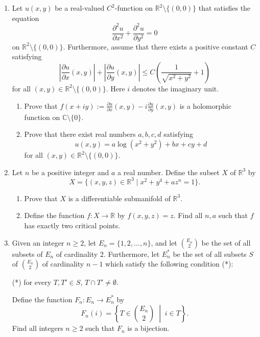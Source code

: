 \documentclass{article}
\begin{document}
\begin{enumerate}[label=\fbox{\arabic*}]
  \item Let $u(x, y)$ be a real-valued $C^2$-function on $\mathbb{R}^2 \setminus \{(0, 0)\}$ that satisfies the equation
        \[ \frac{\partial^2 u}{\partial x^2} + \frac{\partial^2 u}{\partial y^2} = 0 \]
        on $\mathbb{R}^2 \setminus \{(0, 0)\}$. Furthermore, assume that there exists a positive constant $C$ satisfying
        \[ \left| \frac{\partial u}{\partial x}(x, y) \right| + \left| \frac{\partial u}{\partial y}(x, y) \right| \le C \left( \frac{1}{\sqrt{x^2 + y^2}} + 1 \right) \]
        for all $(x, y) \in \mathbb{R}^2 \setminus \{(0, 0)\}$. Here $i$ denotes the imaginary unit.
        \begin{enumerate}[label=(\arabic*)]
          \item Prove that $f(x + iy) := \frac{\partial u}{\partial x}(x, y) - i \frac{\partial u}{\partial y}(x, y)$ is a holomorphic function on $\mathbb{C} \setminus \{0\}$.
          \item Prove that there exist real numbers $a, b, c, d$ satisfying
                \[ u(x, y) = a \log(x^2 + y^2) + bx + cy + d \]
                for all $(x, y) \in \mathbb{R}^2 \setminus \{(0, 0)\}$.
        \end{enumerate}

  \item Let $n$ be a positive integer and $a$ a real number. Define the subset $X$ of $\mathbb{R}^3$ by
        \[ X = \{ (x, y, z) \in \mathbb{R}^3 \mid x^2 + y^4 + az^n = 1 \}. \]
        \begin{enumerate}[label=(\arabic*)]
          \item Prove that $X$ is a differentiable submanifold of $\mathbb{R}^3$.
          \item Define the function $f : X \to \mathbb{R}$ by $f(x, y, z) = z$. Find all $n, a$ such that $f$ has exactly two critical points.
        \end{enumerate}

  \item Given an integer $n \ge 2$, let $E_n = \{1, 2, \dots, n\}$, and let $\binom{E_n}{2}$ be the set of all subsets of $E_n$ of cardinality 2. Furthermore, let $E_n^*$ be the set of all subsets $S$ of $\binom{E_n}{2}$ of cardinality $n - 1$ which satisfy the following condition (*):

        (*) for every $T, T' \in S$, $T \cap T' \neq \emptyset$.

        Define the function $F_n : E_n \to E_n^*$ by
        \[
          F_n(i) = \left\{ T \in \binom{E_n}{2} \;\middle|\; i \in T \right\}.
        \]
        Find all integers $n \ge 2$ such that $F_n$ is a bijection.

\end{enumerate}
\end{document}
